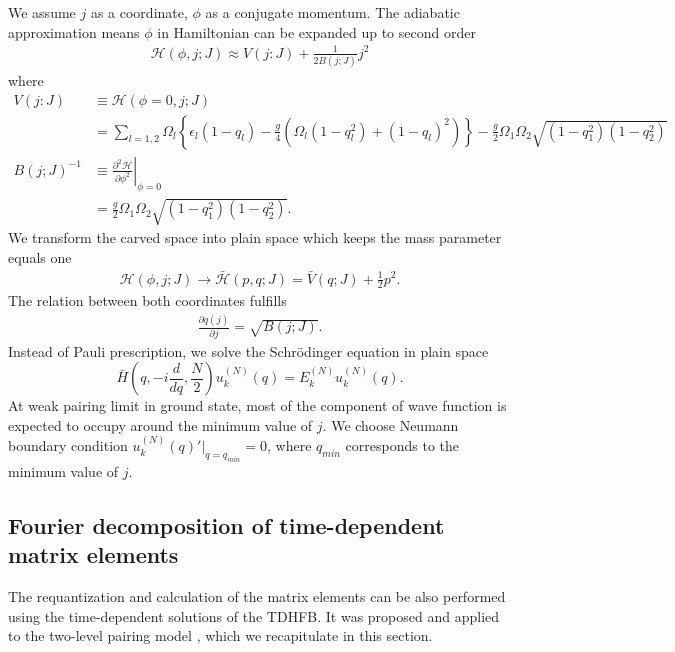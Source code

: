 \documentclass[%
superscriptaddress,
preprint,
showpacs,
nofootinbib,
amsmath,amssymb,
prc,
floatfix ]%
{revtex4-1}
\begin{document}
We assume $j$ as a coordinate, $\phi$ as a conjugate momentum. 
The adiabatic approximation means $\phi$ in Hamiltonian can be
 expanded up to second order
\begin{align}
 \mathcal{H}(\phi,j;J)
	\approx V(j:J) + \frac{1}{2B(j;J)}j^2
\end{align}
where
\begin{align}
 V(j:J) &\equiv \mathcal{H}(\phi=0,j;J) \nonumber \\
  &= \sum_{l=1,2} \Omega_l \left\{ \epsilon_l(1- q_l)
	- \frac{g}{4} (\Omega_l(1-q_l^2)+(1-q_l)^2) \right\}
- \frac{g}{2}\Omega_1\Omega_2
	\sqrt{(1-q_1^2)(1-q_2^2)} \\
 B(j;J)^{-1} &\equiv \left. \frac{\partial^2\mathcal{H}}{\partial\phi^2}\right|_{\phi=0} \nonumber \\
 &= \frac{g}{2}\Omega_1\Omega_2
	\sqrt{(1-q_1^2)(1-q_2^2)} .
\end{align}
We transform the carved space into plain space
 which keeps the mass parameter equals one
\begin{align}
 \mathcal{H}(\phi,j;J) \to \mathcal{\bar{H}}(p,q;J) = \bar{V}(q;J) + \frac{1}{2}p^2 .
\end{align}
The relation between both coordinates fulfills
\begin{align}
 \frac{\partial q(j)}{\partial j} = \sqrt{B(j;J)} .
\end{align}
Instead of Pauli prescription, we solve the Schr\"{o}dinger equation in plain space
\begin{equation}
	\bar{H}\left( q,-i\frac{d}{dq},\frac{N}{2} \right)
	u_k^{(N)}(q) = E_k^{(N)}u_k^{(N)}(q).
	\label{Schroedinger_eq2}
\end{equation}
At weak pairing limit in ground state, most of the component of wave function is expected to occupy around the minimum value of $j$. We choose Neumann boundary condition $u_k^{(N)}(q)'|_{q=q_{min}}=0$, where $q_{min}$ corresponds to the minimum value of $j$.


\subsection{Fourier decomposition of time-dependent matrix elements}
\label{sec:Fourier}

The requantization and calculation of the matrix elements can be also
performed using the time-dependent solutions of the TDHFB.
It was proposed and applied to the two-level pairing model \cite{CDS84},
which we recapitulate in this section.
\end{document}
